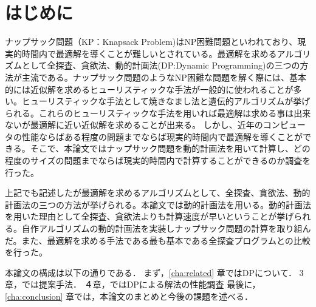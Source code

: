\chapter{はじめに}
\label{cha:intro}

ナップサック問題（KP：Knapsack Problem)はNP困難問題といわれており、現実的時間内で最適解を導くことが難しいとされている。最適解を求めるアルゴリズムとして全探査、貪欲法、動的計画法(DP:Dynamic Programming)の三つの方法が主流である。ナップサック問題のようなNP困難な問題を解く際には、基本的には近似解を求めるヒューリスティックな手法が一般的に使われることが多い。ヒューリスティックな手法として焼きなまし法と遺伝的アルゴリズムが挙げられる。これらのヒューリスティックな手法を用いれば最適解は求める事は出来ないが最適解に近い近似解を求めることが出来る。
しかし、近年のコンピュータの性能ならばある程度の問題までならば現実的時間内で最適解を導くことができる。そこで、本論文ではナップサック問題を動的計画法を用いて計算し、どの程度のサイズの問題までならば現実的時間内で計算することができるのか調査を行った。

上記でも記述したが最適解を求めるアルゴリズムとして、全探査、貪欲法、動的計画法の三つの方法が挙げられる。本論文では動的計画法を用いる。動的計画法を用いた理由として全探査、貪欲法よりも計算速度が早いということが挙げられる。自作アルゴリズムの動的計画法を実装しナップサック問題の計算を取り組んだ。また、最適解を求める手法である最も基本である全探査プログラムとの比較を行った。

本論文の構成は以下の通りである．
まず，\ref{cha:related} 章ではDPについて．
3章，では提案手法．
４章，ではDPによる解法の性能調査
最後に，\ref{cha:conclusion} 章では，本論文のまとめと今後の課題を述べる．